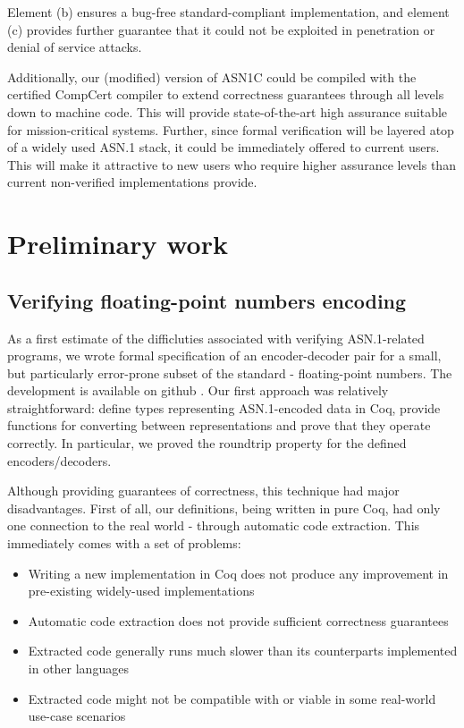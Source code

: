 \documentclass[acmsmall,nonacm]{acmart}
\begin{document}
Element (b) ensures a bug-free standard-compliant implementation, and
element (c) provides further guarantee that it could not be exploited
in penetration or denial of service attacks.

Additionally, our (modified) version of ASN1C could be compiled with
the certified CompCert compiler \cite{CompCert} to extend correctness
guarantees through all levels down to machine code. This will provide state-of-the-art high
assurance suitable for mission-critical systems. Further, since formal
verification will be layered atop of a widely used ASN.1 stack, it
could be immediately offered to current users. This will make it attractive to new users who require higher
assurance levels than current non-verified implementations provide.

\section{Preliminary work}

\subsection{Verifying floating-point numbers encoding}

As a first estimate of the difficluties associated with
verifying ASN.1-related programs, we wrote
formal specification of an encoder-decoder pair for a small, but
particularly error-prone subset of the standard - floating-point numbers. The development is available on github \cite{asn1fpcoq}.
Our first approach was relatively straightforward: define types
representing ASN.1-encoded data in Coq, provide functions for converting
between representations and prove that they operate correctly. In particular, we proved the roundtrip property for the defined encoders/decoders.

Although providing guarantees of correctness, this technique had major disadvantages.
First of all, our definitions, being written in pure Coq, had only one
connection to the real world - through automatic code extraction.
This immediately comes with a set of problems:

\begin{itemize}
\item Writing a new implementation in Coq does not produce any improvement in pre-existing widely-used implementations
\item Automatic code extraction does not provide sufficient correctness guarantees
\item Extracted code generally runs much slower than its counterparts implemented in other languages
\item Extracted code might not be compatible with or viable in some real-world use-case scenarios
\end{itemize}
\end{document}
